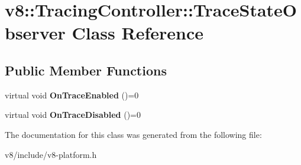 \hypertarget{classv8_1_1TracingController_1_1TraceStateObserver}{}\section{v8\+:\+:Tracing\+Controller\+:\+:Trace\+State\+Observer Class Reference}
\label{classv8_1_1TracingController_1_1TraceStateObserver}
\subsection*{Public Member Functions}
\begin{DoxyCompactItemize}
\item 
\mbox{\label{classv8_1_1TracingController_1_1TraceStateObserver_a3853d90b9458529203fd1c4bc8caf4e3}} 
virtual void {\bfseries On\+Trace\+Enabled} ()=0
\item 
\mbox{\label{classv8_1_1TracingController_1_1TraceStateObserver_a840a68c822844e57e4b023dc4f9e0fee}} 
virtual void {\bfseries On\+Trace\+Disabled} ()=0
\end{DoxyCompactItemize}


The documentation for this class was generated from the following file\+:\begin{DoxyCompactItemize}
\item 
v8/include/v8-\/platform.\+h\end{DoxyCompactItemize}
